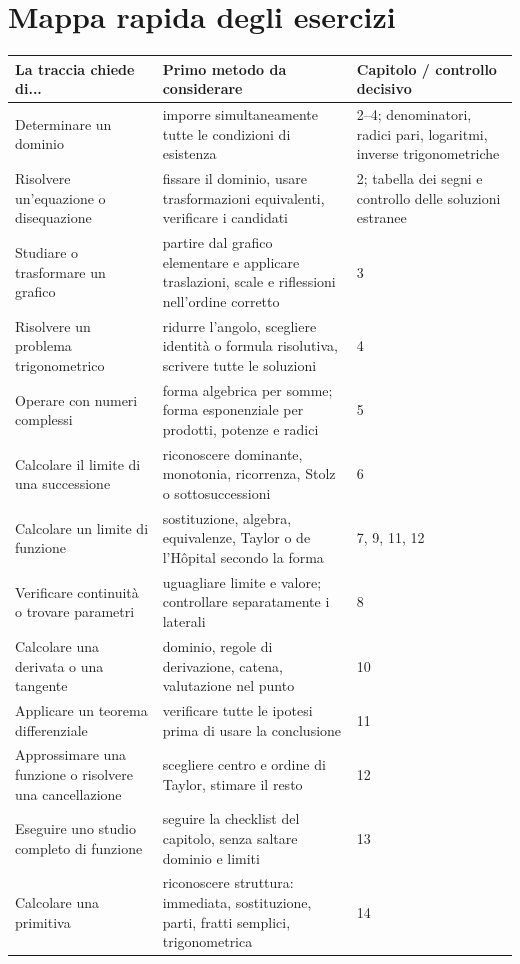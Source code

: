 \chapter*{Mappa rapida degli esercizi}

\begin{longtable}{@{}p{}p{}p{}@{}}
\toprule
\textbf{La traccia chiede di...} & \textbf{Primo metodo da considerare} & \textbf{Capitolo / controllo decisivo}\\
\midrule
\endhead
Determinare un dominio & imporre simultaneamente tutte le condizioni di esistenza & 2--4; denominatori, radici pari, logaritmi, inverse trigonometriche\\
Risolvere un'equazione o disequazione & fissare il dominio, usare trasformazioni equivalenti, verificare i candidati & 2; tabella dei segni e controllo delle soluzioni estranee\\
Studiare o trasformare un grafico & partire dal grafico elementare e applicare traslazioni, scale e riflessioni nell'ordine corretto & 3\\
Risolvere un problema trigonometrico & ridurre l'angolo, scegliere identità o formula risolutiva, scrivere tutte le soluzioni & 4\\
Operare con numeri complessi & forma algebrica per somme; forma esponenziale per prodotti, potenze e radici & 5\\
Calcolare il limite di una successione & riconoscere dominante, monotonia, ricorrenza, Stolz o sottosuccessioni & 6\\
Calcolare un limite di funzione & sostituzione, algebra, equivalenze, Taylor o de l'Hôpital secondo la forma & 7, 9, 11, 12\\
Verificare continuità o trovare parametri & uguagliare limite e valore; controllare separatamente i laterali & 8\\
Calcolare una derivata o una tangente & dominio, regole di derivazione, catena, valutazione nel punto & 10\\
Applicare un teorema differenziale & verificare tutte le ipotesi prima di usare la conclusione & 11\\
Approssimare una funzione o risolvere una cancellazione & scegliere centro e ordine di Taylor, stimare il resto & 12\\
Eseguire uno studio completo di funzione & seguire la checklist del capitolo, senza saltare dominio e limiti & 13\\
Calcolare una primitiva & riconoscere struttura: immediata, sostituzione, parti, fratti semplici, trigonometrica & 14\\

\end{longtable}
